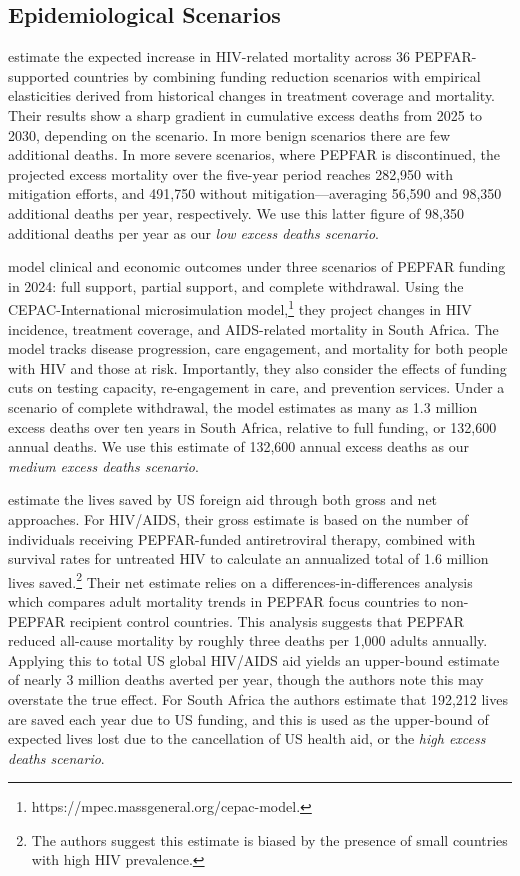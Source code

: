 \documentclass[letterpaper,12pt]{article}
\theoremstyle{definition}
\begin{document}
\begin{spacing}{1.5}
\subsection{Epidemiological Scenarios}

\citet{Brink2025} estimate the expected increase in HIV-related mortality across 36 PEPFAR-supported countries by combining funding reduction scenarios with empirical elasticities derived from historical changes in treatment coverage and mortality. Their results show a sharp gradient in cumulative excess deaths from 2025 to 2030, depending on the scenario. In more benign scenarios there are few additional deaths. In more severe scenarios, where PEPFAR is discontinued, the projected excess mortality over the five-year period reaches 282,950 with mitigation efforts, and 491,750 without mitigation—averaging 56,590 and 98,350 additional deaths per year, respectively. We use this latter figure of 98,350 additional deaths per year as our \textit{low excess deaths scenario}.

\citet{Gandhi2025} model clinical and economic outcomes under three scenarios of PEPFAR funding in 2024: full support, partial support, and complete withdrawal. Using the CEPAC-International microsimulation model,\footnote{https://mpec.massgeneral.org/cepac-model.} they project changes in HIV incidence, treatment coverage, and AIDS-related mortality in South Africa. The model tracks disease progression, care engagement, and mortality for both people with HIV and those at risk. Importantly, they also consider the effects of funding cuts on testing capacity, re-engagement in care, and prevention services. Under a scenario of complete withdrawal, the model estimates as many as 1.3 million excess deaths over ten years in South Africa, relative to full funding, or 132,600 annual deaths. We use this estimate of 132,600 annual excess deaths as our \textit{medium excess deaths scenario}.

\citet{KS2025} estimate the lives saved by US foreign aid through both gross and net approaches. For HIV/AIDS, their gross estimate is based on the number of individuals receiving PEPFAR-funded antiretroviral therapy, combined with survival rates for untreated HIV to calculate an annualized total of 1.6 million lives saved.\footnote{The authors suggest this estimate is biased by the presence of small countries with high HIV prevalence.} Their net estimate relies on a differences-in-differences analysis which compares adult mortality trends in PEPFAR focus countries to non-PEPFAR recipient control countries. This analysis suggests that PEPFAR reduced all-cause mortality by roughly three deaths per 1,000 adults annually. Applying this to total US global HIV/AIDS aid yields an upper-bound estimate of nearly 3 million deaths averted per year, though the authors note this may overstate the true effect. For South Africa the authors estimate that 192,212 lives are saved each year due to US funding, and this is used as the upper-bound of expected lives lost due to the cancellation of US health aid, or the \textit{high excess deaths scenario}.


\end{spacing}
\end{document}
